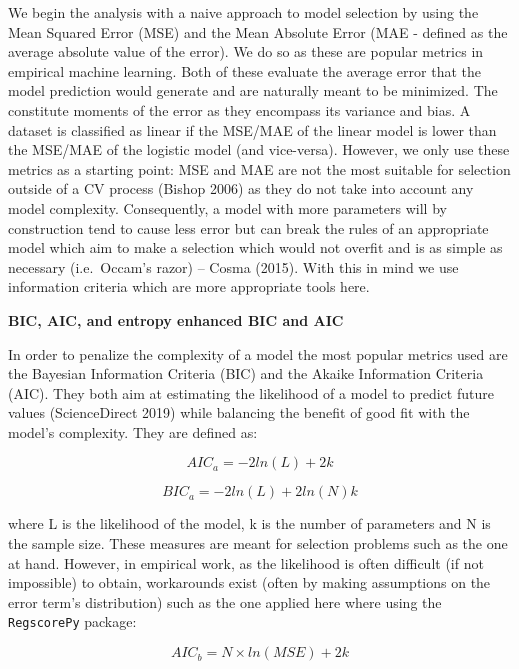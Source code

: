 \documentclass[12pt,]{article}
\begin{document}
We begin the analysis with a naive approach to model selection by using the Mean Squared Error (MSE) and the Mean Absolute Error (MAE - defined as the average absolute value of the error). We do so as these are popular metrics in empirical machine learning. Both of these evaluate the average error that the model prediction would generate and are naturally meant to be minimized. The constitute moments of the error as they encompass its variance and bias.
A dataset is classified as linear if the MSE/MAE of the linear model is lower than the MSE/MAE of the logistic model (and vice-versa).
However, we only use these metrics as a starting point: MSE and MAE are not the most suitable for selection outside of a CV process (Bishop 2006) as they do not take into account any model complexity. Consequently, a model with more parameters will by construction tend to cause less error but can break the rules of an appropriate model which aim to make a selection which would not overfit and is as simple as necessary (i.e.~Occam's razor) -- Cosma (2015). With this in mind we use information criteria which are more appropriate tools here.

\textbf{BIC, AIC, and entropy enhanced BIC and AIC}

In order to penalize the complexity of a model the most popular metrics used are the Bayesian Information Criteria (BIC) and the Akaike Information Criteria (AIC). They both aim at estimating the likelihood of a model to predict future values (ScienceDirect 2019) while balancing the benefit of good fit with the model's complexity. They are defined as:

\begin{equation}
AIC_a = -2ln(L) + 2k
\end{equation}

\begin{equation}
BIC_a = -2ln(L) + 2ln(N)k
\end{equation}

where L is the likelihood of the model, k is the number of parameters and N is the sample size. These measures are meant for selection problems such as the one at hand. However, in empirical work, as the likelihood is often difficult (if not impossible) to obtain, workarounds exist (often by making assumptions on the error term's distribution) such as the one applied here where using the \texttt{RegscorePy} package:

\begin{equation}
AIC_b = N\times ln(MSE) + 2k \label{eq:aic}
\end{equation}
\end{document}
